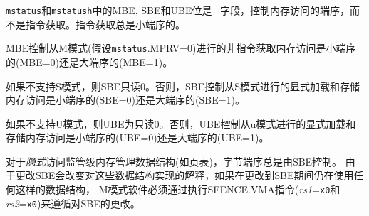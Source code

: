{\tt mstatus}和{\tt mstatush}中的MBE, SBE和UBE位是 \warl\ 字段，控制内存访问的端序，而不是指令获取。指令获取总是小端序的。


MBE控制从M模式(假设{\tt mstatus}.MPRV=0)进行的非指令获取内存访问是小端序的(MBE=0)还是大端序的(MBE=1)。


如果不支持S模式，则SBE只读0。否则，SBE控制从S模式进行的显式加载和存储内存访问是小端序的(SBE=0)还是大端序的(SBE=1)。


如果不支持U模式，则UBE为只读0。否则，UBE控制从u模式进行的显式加载和存储内存访问是小端序的(UBE=0)还是大端序的(UBE=1)。


对于{\em 隐式}访问监管级内存管理数据结构(如页表)，字节端序总是由SBE控制。
由于更改SBE会改变对这些数据结构实现的解释，如果在更改到SBE期间仍在使用任何这样的数据结构，
M模式软件必须通过执行SFENCE.VMA指令({\em rs1}={\tt x0}和{\em rs2}={\tt x0})来遵循对SBE的更改。


\iffalse
\begin{commentary}
Only in contrived scenarios will a given memory-management data structure be
interpreted as both little-endian and big-endian.
In practice, SBE will only be changed at runtime on world switches, in which
case neither the old nor new memory-management data structure will be
reinterpreted in a different endianness.
In this case, no additional SFENCE.VMA is necessary, beyond what would
ordinarily be required for a world switch.
\end{commentary}
\fi

